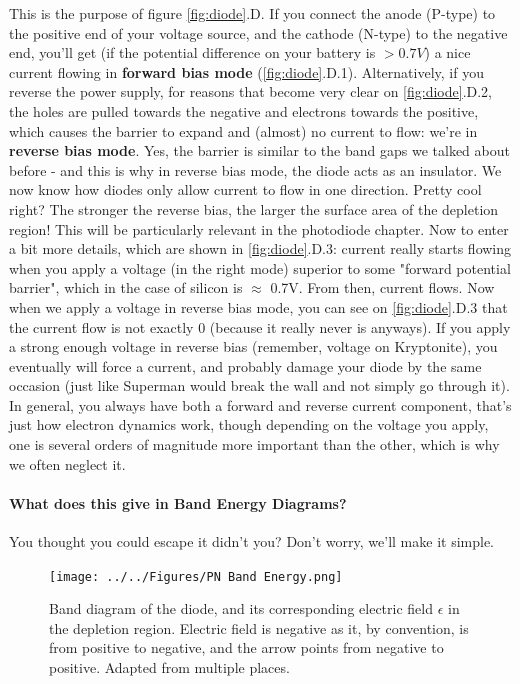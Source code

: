 This is the purpose of figure \ref{fig:diode}.D. If you connect the anode (P-type) to the positive end of your voltage source, and the cathode (N-type) to the negative end, you'll get (if the potential difference on your battery is $>0.7V$) a nice current flowing in \textbf{forward bias mode} (\ref{fig:diode}.D.1). Alternatively, if you reverse the power supply, for reasons that become very clear on \ref{fig:diode}.D.2, the holes are pulled towards the negative and electrons towards the positive, which causes the barrier to expand and (almost) no current to flow: we're in \textbf{reverse bias mode}. Yes, the barrier is similar to the band gaps we talked about before - and this is why in reverse bias mode, the diode acts as an insulator. We now know how diodes only allow current to flow in one direction. Pretty cool right? The stronger the reverse bias, the larger the surface area of the depletion region! This will be particularly relevant in the photodiode chapter. 
Now to enter a bit more details, which are shown in \ref{fig:diode}.D.3: current really starts flowing when you apply a voltage (in the right mode) superior to some "forward potential barrier", which in the case of silicon is $\approx$ 0.7V. From then, current flows. Now when we apply a voltage in reverse bias mode, you can see on \ref{fig:diode}.D.3 that the current flow is not exactly 0 (because it really never is anyways). If you apply a strong enough voltage in reverse bias (remember, voltage on Kryptonite), you eventually will force a current, and probably damage your diode by the same occasion (just like Superman would break the wall and not simply go through it). In general, you always have both a forward and reverse current component, that's just how electron dynamics work, though depending on the voltage you apply, one is several orders of magnitude more important than the other, which is why we often neglect it.

\paragraph{What does this give in Band Energy Diagrams?}
You thought you could escape it didn't you? Don't worry, we'll make it simple. 

\begin{figure}[H]
    \centering
    \texttt{[image: ../../Figures/PN Band Energy.png]}
    \caption{Band diagram of the diode, and its corresponding electric field $\epsilon$ in the depletion region. Electric field is negative as it, by convention, is from positive to negative, and the arrow points from negative to positive. Adapted from multiple places.}
    \label{fig:Diode Band diagram}
\end{figure}


